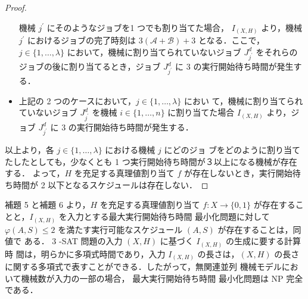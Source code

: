 \documentclass[12pt]{optlab-bachelor}
\begin{document}
\begin{proof}
\begin{itemize}
      機械 $j^{\prime}$ にそのようなジョブを1 つでも割り当てた場合，
      $I_{(X,H)}$ より，機械 $j^{\prime}$ におけるジョブの完了時刻は
      $3(\mathcal{A} + \mathcal{B}) + 3$ となる．ここで，$j \in
      \{1,\ldots,\lambda\}$ において，機械に割り当てられていないジョブ
      $J^d_{j^{\prime}}$ をそれらのジョブの後に割り当てるとき，ジョブ
      $J^d_{j^{\prime}}$ に 3 の実行開始待ち時間が発生する．
      \item 上記の 2 つのケースにおいて，$j \in \{1,\ldots,\lambda\}$ におい
      て，機械に割り当てられていないジョブ $J^d_{j^{\prime}}$ を機械 $i
      \in \{1,\ldots,n\}$ に割り当てた場合 $I_{(X,H)}$ より，ジョブ
      $J^d_{j^{\prime}}$ に 3 の実行開始待ち時間が発生する．
    \end{itemize}
    以上より，各 $j \in \{1,\ldots,\lambda\}$ における機械 $j$ にどのジョ
    ブをどのように割り当てたしたとしても，少なくとも 1 つ実行開始待ち時間が３以上になる機械が存在する．
    よって，$H$ を充足する真理値割り当て $f$ が存在しないとき，実行開始待
    ち時間が 2 以下となるスケジュールは存在しない．
  \end{proof}

  補題 5 と補題 6 より，$H$ を充足する真理値割り当て $f : X \to \{0,
  1\}$ が存在することと，$I_{(X,H)}$ を入力とする最大実行開始待ち時間
  最小化問題に対して $\varphi(A, S) \le 2$
  を満たす実行可能なスケジュール $(A, S)$ が存在することは，同値で
  ある．
  3 -SAT 問題の入力 $(X,H)$ に基づく $I_{(X,H)}$ の生成に要する計算時
  間は，明らかに多項式時間であり，入力 $I_{(X,H)}$ の長さは，$(X, H)$
  の長さに関する多項式で表すことができる．したがって，無関連並列
  機械モデルにおいて機械数が入力の一部の場合， 最大実行開始待ち時間
  最小化問題は NP 完全である．
\end{document}
